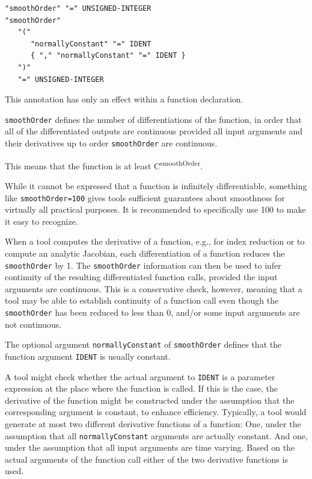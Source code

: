 \begin{annotationdefinition}[smoothOrder]
\begin{synopsis}[grammar]\begin{lstlisting}
"smoothOrder" "=" UNSIGNED-INTEGER
"smoothOrder"
   "("
      "normallyConstant" "=" IDENT
      { "," "normallyConstant" "=" IDENT }
   ")"
   "=" UNSIGNED-INTEGER
\end{lstlisting}\end{synopsis}
\begin{semantics}
This annotation has only an effect within a function declaration.

{\lstinline!smoothOrder!} defines the number of differentiations of the function, in order that all of the differentiated outputs are continuous provided all input arguments and their derivatives up to order {\lstinline!smoothOrder!} are continuous.

\begin{nonnormative}
This means that the function is at least C\textsuperscript{smoothOrder}.

While it cannot be expressed that a function is infinitely differentiable, something like \lstinline!smoothOrder=100! gives tools sufficient guarantees about smoothness for virtually all practical purposes.
It is recommended to specifically use 100 to make it easy to recognize.

When a tool computes the derivative of a function, e.g., for index reduction or to compute an analytic Jacobian, each differentiation of a function reduces the \lstinline!smoothOrder! by 1.
The \lstinline!smoothOrder! information can then be used to infer continuity of the resulting differentiated function calls, provided the input arguments are continuous.
This is a conservative check, however, meaning that a tool may be able to establish continuity of a function call even though the \lstinline!smoothOrder! has been reduced to less than 0, and/or some input arguments are not continuous.
\end{nonnormative}

The optional argument {\lstinline!normallyConstant!} of {\lstinline!smoothOrder!} defines that the function argument {\lstinline!IDENT!} is usually constant.

\begin{nonnormative}
A tool might check whether the actual argument to {\lstinline!IDENT!} is a parameter expression at the place where the function is called.
If this is the case, the derivative of the function might be constructed under the assumption that the corresponding argument is constant, to enhance efficiency.
Typically, a tool would generate at most two different derivative functions of a function:
One, under the assumption that all {\lstinline!normallyConstant!} arguments are actually constant.
And one, under the assumption that all input arguments are time varying.
Based on the actual arguments of the function call either of the two derivative functions is used.


\end{nonnormative}
\end{semantics}
\end{annotationdefinition}

